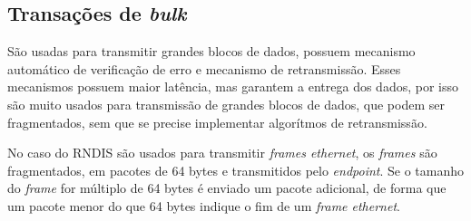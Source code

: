 \subsection{Transações de \textit{bulk}}

São usadas para transmitir grandes blocos de dados, possuem mecanismo automático de verificação de erro e mecanismo de retransmissão. Esses mecanismos possuem maior latência, mas garantem a entrega dos dados, por isso são muito usados para transmissão de grandes blocos de dados, que podem ser fragmentados, sem que se precise implementar algorítmos de retransmissão.

No caso do RNDIS são usados para transmitir \textit{frames ethernet}, os \textit{frames} são fragmentados, em pacotes de 64 bytes e transmitidos pelo \textit{endpoint}. Se o tamanho do \textit{frame} for múltiplo de 64 bytes é enviado um pacote adicional, de forma que um pacote menor do que 64 bytes indique o fim de um \textit{frame ethernet}.

